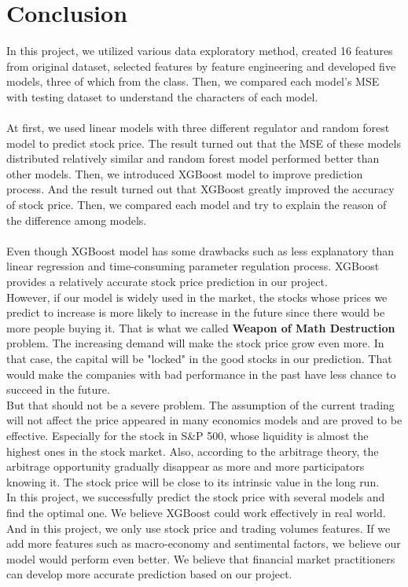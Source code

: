 \documentclass[fleqn,10pt]{SelfArx} %
\begin{document}
\section{Conclusion}
In this project, we utilized various data exploratory method, created 16 features from original dataset, selected features by feature engineering and developed five models, three of which from the class. Then, we compared each model's MSE with testing dataset to understand the characters of each model.\\
\\
\noindent
At first, we used linear models with three different regulator and random forest model to predict stock price. The result turned out that the MSE of these models distributed relatively similar and random forest model performed better than other models. Then, we introduced XGBoost model to improve prediction process. And the result turned out that XGBoost greatly improved the accuracy of stock price. Then, we compared each model and try to explain the reason of the difference among models. \\
\\
Even though XGBoost model has some drawbacks such as less explanatory than linear regression and time-consuming parameter regulation process. XGBoost provides a relatively accurate stock price prediction in our project.\\
\newline
\noindent
However, if our model is widely used in the market, the stocks whose prices we predict to increase is more likely to increase in the future since there would be more people buying it. That is what we called \textbf{Weapon of Math Destruction} problem. The increasing demand will make the stock price grow even more. In that case, the capital will be "locked" in the good stocks in our prediction. That would make the companies with bad performance in the past have less chance to succeed in the future.\\
\newline
\noindent
But that should not be a severe problem. The assumption of the current trading will not affect the price appeared in many economics models and are proved to be effective. Especially for the stock in S\&P 500, whose liquidity is almost the highest ones in the stock market. Also, according to the arbitrage theory, the arbitrage opportunity gradually disappear as more and more participators knowing it. The stock price will be close to its intrinsic value in the long run.\\
\newline
\noindent
In this project, we successfully predict the stock price with several models and find the optimal one. We believe XGBoost could work effectively in real world. And in this project, we only use stock price and trading volumes features. If we add more features such as macro-economy and sentimental factors, we believe our model would perform even better. We believe that financial market practitioners can develop more accurate prediction based on our project. 
\end{document}
